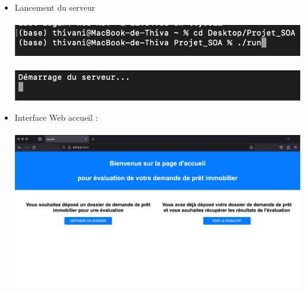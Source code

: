 \documentclass{article}
\begin{document}
	\begin{itemize}
		\item Lancement du serveur \\
		\\
		\includegraphics[width=\textwidth]{images/run.png} \\
		\\
		\includegraphics[width=\textwidth]{images/lancement.png}
		
		\item Interface Web accueil : \\
		\\
		\includegraphics[width=\textwidth]{images/accueil.png}
	\end{itemize}
	
\end{document}

